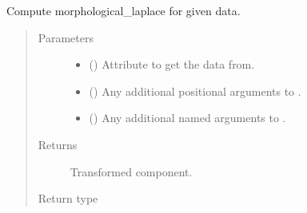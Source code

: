 \documentclass[letterpaper,10pt,english]{sphinxmanual}
\begin{document}
\begin{fulllineitems}
\begin{fulllineitems}
\label{\detokenize{api/base_classes:geology.src.base_spatial.SpatialComponent.morphological_laplace}}
Compute morphological\_laplace for given data.
\begin{quote}\begin{description}
\item[{Parameters}] \leavevmode\begin{itemize}
\item {} 
 (\sphinxstyleliteralemphasis{\sphinxupquote{, }}) \textendash{} Attribute to get the data from.

\item {} 
 () \textendash{} Any additional positional arguments to .

\item {} 
 () \textendash{} Any additional named arguments to .

\end{itemize}

\item[{Returns}] \leavevmode
{} \textendash{} Transformed component.

\item[{Return type}] \leavevmode
{\hyperref[\detokenize{api/base_classes:geology.src.base_spatial.SpatialComponent}]{}}

\end{description}\end{quote}

\end{fulllineitems}



\end{fulllineitems}
\end{document}
